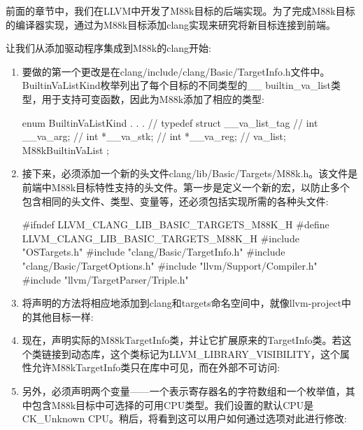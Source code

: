 
前面的章节中，我们在LLVM中开发了M88k目标的后端实现。为了完成M88k目标的编译器实现，通过为M88k目标添加clang实现来研究将新目标连接到前端。


让我们从添加驱动程序集成到M88k的clang开始:

\begin{enumerate}
\item
要做的第一个更改是在clang/include/clang/Basic/TargetInfo.h文件中。BuiltinVaListKind枚举列出了每个目标的不同类型的\_\_ builtin\_va\_list类型，用于支持可变函数，因此为M88k添加了相应的类型:

\begin{cpp}
enum BuiltinVaListKind {
    . . .
    // typedef struct __va_list_tag {
        // int __va_arg;
        // int *__va_stk;
        // int *__va_reg;
        //} va_list;
    M88kBuiltinVaList
};
\end{cpp}

\item
接下来，必须添加一个新的头文件clang/lib/Basic/Targets/M88k.h。该文件是前端中M88k目标特性支持的头文件。第一步是定义一个新的宏，以防止多个包含相同的头文件、类型、变量等，还必须包括实现所需的各种头文件:

\begin{cpp}
#ifndef LLVM_CLANG_LIB_BASIC_TARGETS_M88K_H
#define LLVM_CLANG_LIB_BASIC_TARGETS_M88K_H
#include "OSTargets.h"
#include "clang/Basic/TargetInfo.h"
#include "clang/Basic/TargetOptions.h"
#include "llvm/Support/Compiler.h"
#include "llvm/TargetParser/Triple.h"
\end{cpp}

\item
将声明的方法将相应地添加到clang和targets命名空间中，就像llvm-project中的其他目标一样:

\begin{cpp}
namespace clang {
namespace targets {
\end{cpp}

\item
现在，声明实际的M88kTargetInfo类，并让它扩展原来的TargetInfo类。若这个类链接到动态库，这个类标记为LLVM\_LIBRARY\_VISIBILITY，这个属性允许M88kTargetInfo类只在库中可见，而在外部不可访问:

\begin{cpp}
class LLVM_LIBRARY_VISIBILITY M88kTargetInfo: public TargetInfo
{
\end{cpp}

\item
另外，必须声明两个变量——一个表示寄存器名的字符数组和一个枚举值，其中包含M88k目标中可选择的可用CPU类型。我们设置的默认CPU是CK\_Unknown CPU。稍后，将看到这可以用户如何通过选项对此进行修改:


\end{enumerate}
